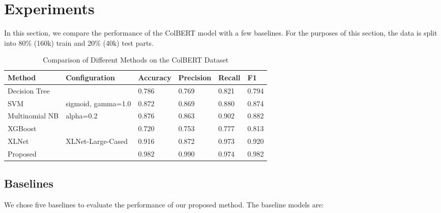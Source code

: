 \documentclass[journal]{IEEEtran}
\begin{document}
\section{Experiments}

In this section, we compare the performance of the ColBERT model with a few baselines. For the purposes of this section, the data is split into 80\% (160k) train and 20\% (40k) test parts.

\begin{table*}[t]
  \caption{Comparison of Different Methods on the ColBERT Dataset}
  \label{table-3}
  \centering
  \begin{tabular}{l|p{3.4cm}llll}
  \hline
Method        & Configuration                                                                              & Accuracy & Precision & Recall & F1    \\ \hline
Decision Tree &         & 0.786  & 0.769    & 0.821     & 0.794 \\ 
SVM           & sigmoid, gamma=1.0  & 0.872    & 0.869     & 0.880  & 0.874 \\
Multinomial NB &    alpha=0.2        & 0.876  & 0.863    & 0.902     & 0.882 \\
XGBoost &         & 0.720  & 0.753    & 0.777     & 0.813 \\
XLNet           & XLNet-Large-Cased  & 0.916    & 0.872     & 0.973  & 0.920 \\
    \hline
Proposed       &  & 0.982    & 0.990     & 0.974  & 0.982 \\ \hline
\end{tabular}
\end{table*}



\subsection{Baselines}

We chose five baselines to evaluate the performance of our proposed method. The baseline models are:
\end{document}
